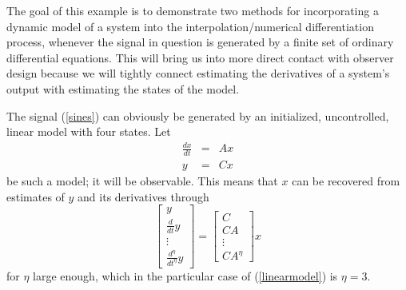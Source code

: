The goal of this example is to demonstrate two methods for incorporating
a dynamic model of a system into the interpolation/numerical differentiation
process,
whenever the signal in question is generated by a finite set of ordinary
differential equations.
This will bring us into more direct contact with observer design because we
will tightly connect estimating the derivatives of a system's output
with estimating the states of the model.

The signal (\ref{sines}) can obviously be generated by an initialized,
uncontrolled, linear model with four states.  Let 
\begin{equation}
\begin{array}{rcl}
\frac{dx}{dt} & = &  A x  \\
y & = & C x 
\end{array}
\label{linearmodel}
\end{equation}
be such a model; it will be observable.  This means that $x$ can be recovered
from estimates of $y$ and its derivatives through
\begin{equation} \left[ \begin{array}{r} 
y \\ \frac{d}{dt}y \\ \vdots \\ \frac{d^{\eta}}{dt^{\eta}}y
\end{array} \right] = \left[ \begin{array}{l} 
C \\ CA \\ \vdots \\ CA^{\eta}
\end{array} \right] x
\label{obsmat}
\end{equation}
for $\eta$ large enough, which in the particular case of (\ref{linearmodel}) is
$\eta = 3$.

